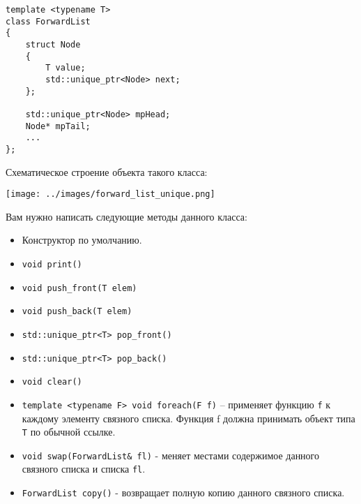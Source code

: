 \documentclass{article}
\begin{document}
\begin{lstlisting}
template <typename T>
class ForwardList
{
    struct Node
    {
        T value;
        std::unique_ptr<Node> next;
    };
    
    std::unique_ptr<Node> mpHead;
    Node* mpTail;
	...
};
\end{lstlisting}

Схематическое строение объекта такого класса:

\begin{center}
\texttt{[image: ../images/forward\_list\_unique.png]}
\end{center}

Вам нужно написать следующие методы данного класса:

\begin{itemize}
\item Конструктор по умолчанию.
\item \texttt{void print()}
\item \texttt{void push\_front(T elem)}
\item \texttt{void push\_back(T elem)}
\item \texttt{std::unique\_ptr<T> pop\_front()}
\item \texttt{std::unique\_ptr<T> pop\_back()}
\item \texttt{void clear()}
\item \texttt{template <typename F> void foreach(F f)} -- применяет функцию \texttt{f} к каждому элементу связного списка. Функция f должна принимать объект типа \texttt{T} по обычной ссылке.


\item \texttt{void swap(ForwardList\& fl)} - меняет местами содержимое данного связного списка и списка \texttt{fl}.
\item \texttt{ForwardList copy()} - возвращает полную копию данного связного списка.
\end{itemize}
\end{document}
